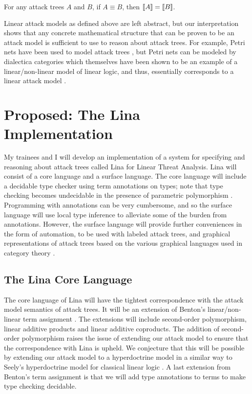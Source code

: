 \begin{full}
\begin{lemma}[Soundness]
  \label{lemma:soundness}
  For any attack trees $A$ and $B$, if $A \equiv B$, then $[\negthinspace[A]\negthinspace]
  = [\negthinspace[B]\negthinspace]$.
\end{lemma}

Linear attack models as defined above are left abstract, but our
interpretation shows that any concrete mathematical structure that can
be proven to be an attack model is sufficient to use to reason about
attack trees.  For example, Petri nets have been used to model attack
trees \cite{McDermott:2001}, but Petri nets can be modeled by
dialectica categories \cite{Brown:1991} which themselves have been
shown to be an example of a linear/non-linear model of linear logic,
and thus, essentially corresponds to a linear attack model
\cite{Eades:2015}.
\section{Proposed: The Lina Implementation}
\label{sec:prop-lina}
My trainees and I will develop an implementation of a system for
specifying and reasoning about attack trees called Lina for Linear
Threat Analysis.  Lina will consist of a core language and a surface
language.  The core language will include a decidable type checker
using term annotations on types; note that type checking becomes
undecidable in the presence of parametric polymorphism
\cite{Wells:1999}.  Programming with annotations can be very
cumbersome, and so the surface language will use local type inference
\cite{Pierce:2000} to alleviate some of the burden from annotations.
However, the surface language will provide further conveniences in the
form of automation, to be used with labeled attack trees, and
graphical representations of attack trees based on the various
graphical languages used in category theory \cite{Selinger:2009}.

\subsection{The Lina Core Language}
\label{subsec:core_language}

The core language of Lina will have the tightest correspondence with
the attack model semantics of attack trees.  It will be an extension
of Benton's linear/non-linear term assignment \cite{Benton:1994}.  The
extensions will include second-order polymorphism, linear additive
products and linear additive coproducts.  The addition of second-order
polymorphism raises the issue of extending our attack model to ensure
that the correspondence with Lina is upheld.  We conjecture that this
will be possible by extending our attack model to a hyperdoctrine
model in a similar way to Seely's hyperdoctrine model for classical
linear logic \cite{Seely:1990}.  A last extension from Benton's term
assignment is that we will add type annotations to terms to make type
checking decidable.


\end{full}
